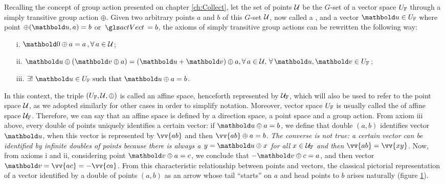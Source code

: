 Recalling the concept of group action presented on chapter \ref{ch:Collect}, let the set of points $\mathcal{U}$ be the $G$-set of a vector space $U_{\mathbb{F}}$ through a simply transitive group action $\oplus$. Given two arbitrary points $a$ and $b$ of this $G$-set $\mathcal{U}$, now called a , and a vector $\vto{u}\in U_\cam{F}$ where point $\fua{\oplus}{\vto{u}, a}=b$ or $\gloref{actVect}=b$, the axioms of simply transitive group actions can be rewritten the following way:
\begin{itemize}\label{ax:pointSpaces}
\setlength\itemsep{.1em}
\item[i.]  $\vto{0}\oplus a=a\,,\forall \, \ele{a} \in \epu{U}$;
\item[ii.] $\vto{u}\oplus(\vto{v}\oplus a)=(\vto{u}+\vto{v})\oplus a, \forall \, \ele{a}\in \epu{U},\,\forall\, \vto{u},\vto{v}\in U_\cam{F}$;
\item[iii.]  $\exists !\,\, \vto{u}\in U_\cam{F}\textrm{ such that } \vto{u}\oplus a=b$.	
\end{itemize}
In this context, the triple $(U_{\mathbb{F}},\mathcal{U},\oplus)$ is called an affine space, henceforth represented by ${\mathcal{U}}_{\mathbb{F}}$, which will also be used to refer to the point space $\mathcal{U}$, as we adopted similarly for other cases in order to simplify notation. Moreover, vector space $U_{\mathbb{F}}$ is usually called the  of affine space ${\mathcal{U}}_{\mathbb{F}}$. Therefore, we can say that an affine space is defined by a direction space, a point space and a group action. From axiom iii above, every double of points uniquely identifies a certain vector: if $\vto{u}\oplus a=b$, we define that double $(a,b)$ identifies vector $\vto{u}$, when this vector is represented by $\vv{ab}$ and then $\vv{ab}\oplus a=b$. \emph{The converse is not true: a certain vector can be identified by infinite doubles of points because there is always a $y=\vto{u}\oplus x$ for all $x\in{\mathcal{U}}_{\mathbb{F}}$ and then $\vv{ab}=\vv{xy}$}. Now, from axioms i and ii, considering point $\vto{v}\oplus a=c$, we conclude that $-\vto{v}\oplus c=a$, and then vector $\vto{v}=\vv{ac}=-\vv{ca}$. From this characteristic relationship between points and vectors, the classical pictorial representation of a vector identified by a double of points $(a,b)$ as an arrow whose tail ``starts'' on $a$ and head points to $b$ arises naturally (figure \ref{fg:vetorSeta}).
\begin{figure}[!ht]
\centering
\begin{center}
\scalebox{.72}{}
\end{center}
\label{fg:vetorSeta}
\end{figure}

